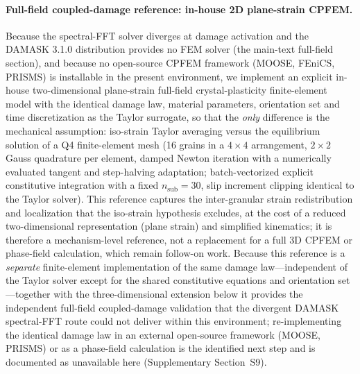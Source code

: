 \documentclass[12pt,a4paper,twocolumn]{article}
\begin{document}
\paragraph{Full-field coupled-damage reference: in-house 2D plane-strain CPFEM.}
Because the spectral-FFT solver diverges at damage activation and the DAMASK 3.1.0 distribution provides no FEM solver (the main-text full-field section), and because no open-source CPFEM framework (MOOSE, FEniCS, PRISMS) is installable in the present environment, we implement an explicit in-house two-dimensional plane-strain full-field crystal-plasticity finite-element model with the identical damage law, material parameters, orientation set and time discretization as the Taylor surrogate, so that the \emph{only} difference is the mechanical assumption: iso-strain Taylor averaging versus the equilibrium solution of a Q4 finite-element mesh (16 grains in a $4\times4$ arrangement, $2\times2$ Gauss quadrature per element, damped Newton iteration with a numerically evaluated tangent and step-halving adaptation; batch-vectorized explicit constitutive integration with a fixed $n_{\mathrm{sub}}=30$, slip increment clipping identical to the Taylor solver). This reference captures the inter-granular strain redistribution and localization that the iso-strain hypothesis excludes, at the cost of a reduced two-dimensional representation (plane strain) and simplified kinematics; it is therefore a mechanism-level reference, not a replacement for a full 3D CPFEM or phase-field calculation, which remain follow-on work. Because this reference is a \emph{separate} finite-element implementation of the same damage law---independent of the Taylor solver except for the shared constitutive equations and orientation set---together with the three-dimensional extension below it provides the independent full-field coupled-damage validation that the divergent DAMASK spectral-FFT route could not deliver within this environment; re-implementing the identical damage law in an external open-source framework (MOOSE, PRISMS) or as a phase-field calculation is the identified next step and is documented as unavailable here (Supplementary Section~S9).
\end{document}
